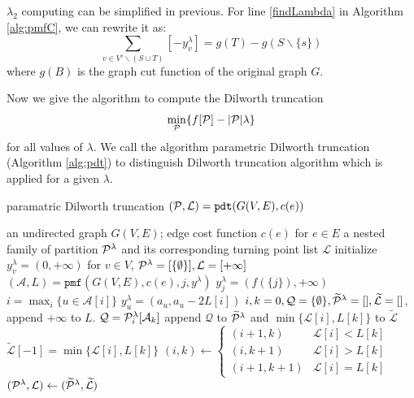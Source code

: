 \documentclass{article}
\begin{document}
$\lambda_2$ computing can be simplified in previous. For line \ref{findLambda} in  Algorithm \ref{alg:pmfC},  we can rewrite it as:
\begin{equation*}
\sum_{v\in V'\backslash (S\cup T)} [-y^{\lambda}_v ] = g(T)-g(S\backslash\{s\})
\end{equation*}
where $g(B)$ is the graph cut function of the original graph $G$.

Now we give the algorithm to compute the Dilworth truncation $$\min_{\P}\{f[\P] - \abs{\P} \lambda \}$$for all values of $\lambda$. We call the algorithm parametric Dilworth truncation (Algorithm \ref{alg:pdt}) to distinguish Dilworth truncation algorithm which is applied for a given $\lambda$.
\begin{algorithm}
\caption{paramatric Dilworth truncation $(\P, \mathcal{L})=\texttt{pdt}(G(V,E), c(e))$}\label{alg:pdt}
\begin{algorithmic}[1]
\REQUIRE an undirected graph $G(V, E)$; edge cost function $c(e)$ for $e\in E$
\ENSURE a nested family of partition $\P^{\lambda}$ and its corresponding turning point list $\mathcal{L}$
\STATE initialize $y^{\lambda}_v = (0, +\infty)$ for $ v \in V$, $\P^{\lambda} = [\{\emptyset\}], \mathcal{L} = [+\infty]$
\STATE  $(\mathcal{A}, L) = \texttt{pmf}(G(V,E), c(e), j, y^{\lambda})$
\STATE $y^{\lambda}_j = (f(\{j\}), +\infty)$
\ELSE
\STATE $ i = \max_i \{ u \in \mathcal{A}[i]\}$
\STATE $y_u^{\lambda} = (a_u, a_u - 2 L[i])$
\ENDIF
\ENDIF
\ENDFOR
\STATE $i, k = 0, \mathcal{Q} = \{\emptyset\}, \widetilde{\mathcal{\P}}^{\lambda} = [], \widetilde{\mathcal{L}} = []$, append $+\infty$ to $L$.
\STATE $\mathcal{Q} = \P^{\lambda}_i[\mathcal{A}_k]$
\STATE append $\mathcal{Q}$ to $\widetilde{\mathcal{\P}}^{\lambda}$ and $\min\{\mathcal{L}[i], L[k]\}$
to $\widetilde{\mathcal{L}}$
\ELSE
\STATE $\widetilde{\mathcal{L}}[-1] = \min\{\mathcal{L}[i], L[k]\}$
\ENDIF
\STATE $(i, k) \leftarrow \begin{cases} (i+1, k) & \mathcal{L}[i] < L[k] \\  (i, k+1) & \mathcal{L}[i] > L[k]\\ (i+1, k+1) & \mathcal{L}[i] = L[k]\end{cases}$
\ENDWHILE
\STATE $(\P^{\lambda}, \mathcal{L}) \leftarrow (\widetilde{\mathcal{\P}}^{\lambda},  \widetilde{\mathcal{L}})$
\ENDFOR
\end{algorithmic}
\end{algorithm}
\end{document}
